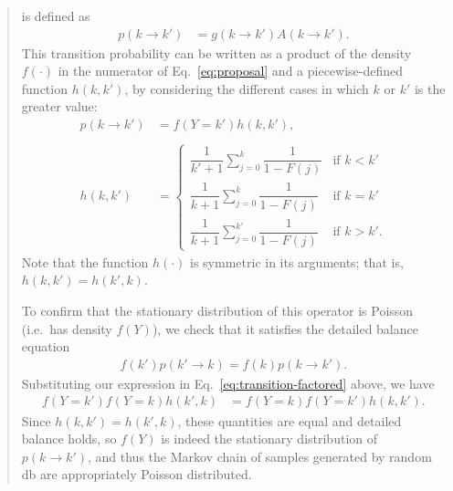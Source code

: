 \documentclass[11pt,reqno]{amsart}
\newcommand{\+}[1]{\ensuremath{{\mathbf{#1}}}}
\begin{document}
\begin{quotation}
is defined as 
\begin{align}
p(k \rightarrow k') &= g(k \rightarrow k')A(k \rightarrow k').
\label{eq:transition}
\end{align}
This transition probability can be written as a product of the density $f(\cdot)$ in the numerator of Eq.~\ref{eq:proposal} and a piecewise-defined function $h(k, k')$, by considering the different cases in which $k$ or $k'$ is the greater value:
\begin{align}
p(k\rightarrow k') &= f(Y=k')h(k, k'),
\label{eq:transition-factored}
\\ %
\nonumber \\
h(k, k') &=
\begin{cases}
\dfrac{1}{k'+1} \sum_{j=0}^{k} \dfrac{1}{1 - F(j)} &\mbox{if } k < k' \\
\dfrac{1}{k+1} \sum_{j=0}^{k} \dfrac{1}{1 - F(j)} &\mbox{if } k = k' \\
\dfrac{1}{k+1} \sum_{j=0}^{k'} \dfrac{1}{1 - F(j)} &\mbox{if } k > k'.
\end{cases}
\end{align}
Note that the function $h(\cdot)$ is symmetric in its arguments; that is, $h(k, k') = h(k', k)$.
\vspace{1em}

\noindent To confirm that the stationary distribution of this operator is Poisson (i.e.~has density $f(Y)$), we check that it satisfies the detailed balance equation
\begin{align}
f(k')p(k' \rightarrow k) = f(k)p(k \rightarrow k').
\end{align}
Substituting our expression in Eq.~\ref{eq:transition-factored} above, we have
\begin{align}
f(Y=k')f(Y=k)h(k', k) &= f(Y=k)f(Y=k')h(k, k').
\end{align}
Since $h(k, k') = h(k', k)$, these quantities are equal and detailed balance holds, so $f(Y)$ is indeed the stationary distribution of $p(k \rightarrow k')$, and thus the Markov chain of samples generated by random db are appropriately Poisson distributed.
\end{quotation}
\fi



\end{document}
